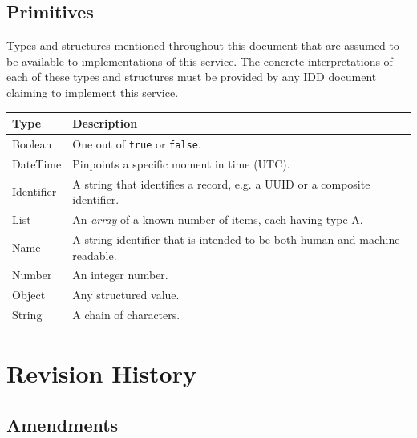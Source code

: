 \documentclass[a4paper]{arrowhead}
\newcommand{\pdef}[1]{{\textcolor{ArrowheadGrey}{#1\label{sec:model:primitives:#1}\label{sec:model:primitives:#1s}\label{sec:model:primitives:#1es}}}}
\begin{document}
\subsection{Primitives}
\label{sec:model:primitives}

Types and structures mentioned throughout this document that are assumed to be available to implementations of this service.
The concrete interpretations of each of these types and structures must be provided by any IDD document claiming to implement this service.

\noindent\begin{tabularx}{\textwidth}{| p{4.6cm} | X |} \hline
\rowcolor{gray!33} Type & Description \\ \hline
\pdef{Boolean} & One out of \texttt{true} or \texttt{false}. \\ \hline
\pdef{DateTime} & Pinpoints a specific moment in time (UTC). \\ \hline
\pdef{Identifier} & A string that identifies a record, e.g. a UUID or a composite identifier. \\ \hline
\pdef{List} & An \textit{array} of a known number of items, each having type A. \\ \hline
\pdef{Name} & A string identifier that is intended to be both human and machine-readable. \\ \hline
\pdef{Number} & An integer number. \\ \hline
\pdef{Object} & Any structured value. \\ \hline
\pdef{String} & A chain of characters. \\ \hline
\end{tabularx}

\newpage




\newpage

\section{Revision History}
\subsection{Amendments}
\end{document}
